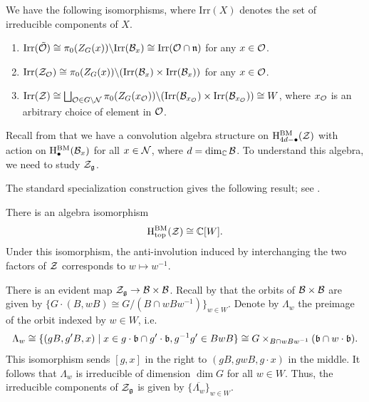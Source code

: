 \begin{corollary}{}
    We have the following isomorphisms, where $\mathrm{Irr}(X)$ denotes the set of irreducible components of $X$.
    \begin{enumerate}
        \item $\mathrm{Irr}(\tilde{\mathcal{O}}) \cong \pi_0(Z_G(x))\backslash\mathrm{Irr}(\mathcal{B}_x) \cong \mathrm{Irr}(\mathcal{O} \cap \mathfrak{n})$ for any $x \in \mathcal{O}$.
        \item $\mathrm{Irr}(\mathcal{Z}_{\mathcal{O}}) \cong \pi_0(Z_G(x))\backslash(\mathrm{Irr}(\mathcal{B}_x) \times \mathrm{Irr}(\mathcal{B}_x))$ for any $x \in \mathcal{O}$.
        \item $\mathrm{Irr}(\mathcal{Z}) \cong \bigsqcup_{\mathcal{O} \in G \backslash \mathcal{N}} \pi_0(Z_G(x_{\mathcal{O}}))\backslash(\mathrm{Irr}(\mathcal{B}_{x_{\mathcal{O}}}) \times \mathrm{Irr}(\mathcal{B}_{x_{\mathcal{O}}})) \cong W$, where $x_{\mathcal{O}}$ is an arbitrary choice of element in $\mathcal{O}$.
    \end{enumerate}
\end{corollary}

Recall from  that we have a convolution algebra structure on $\mathrm{H}^\mathrm{BM}_{4d-\bullet}(\mathcal{Z})$ with action on $\mathrm{H}^\mathrm{BM}_\bullet(\mathcal{B}_x)$ for all $x \in \mathcal{N}$, where $d = \dim_\mathbb{C} \mathcal{B}$. To understand this algebra, we need to study $\mathcal{Z}_{\mathfrak{g}}$.

The standard specialization construction gives the following result;
see \cite[Section 3]{chriss1997representation}.
\begin{theorem}{}
  There is an algebra isomorphism
  \[
    \mathrm{H}^\mathrm{BM}_\mathrm{top}(\mathcal{Z})\cong\mathbb{C}[W].
  \]
  Under this isomorphism, the anti-involution induced by interchanging
  the two factors of $\mathcal{Z}$ corresponds to $w\mapsto w^{-1}$.
\end{theorem}

\iffalse

There is an evident map $\mathcal{Z}_{\mathfrak{g}} \to \mathcal{B} \times \mathcal{B}$. Recall by  that the orbits of $\mathcal{B} \times \mathcal{B}$ are given by $\{ G \cdot (B, wB) \cong G/(B \cap wBw^{-1}) \}_{w \in W}$. Denote by $\Lambda_w$ the preimage of the orbit indexed by $w \in W$, i.e.
\begin{equation*}
    \Lambda_w \cong \{ (gB, g'B, x) \mid x \in g \cdot \mathfrak{b} \cap g' \cdot \mathfrak{b}, g^{-1}g' \in BwB \} \cong G \times_{B \cap wBw^{-1}} (\mathfrak{b} \cap w \cdot \mathfrak{b}).
\end{equation*}
This isomorphism sends $[g, x]$ in the right to $(gB, gwB, g \cdot x)$ in the middle. It follows that $\Lambda_w$ is irreducible of dimension $\dim G$ for all $w \in W$. Thus, the irreducible components of $\mathcal{Z}_{\mathfrak{g}}$ is given by $\{ \overline{\Lambda_w} \}_{w \in W}$.

